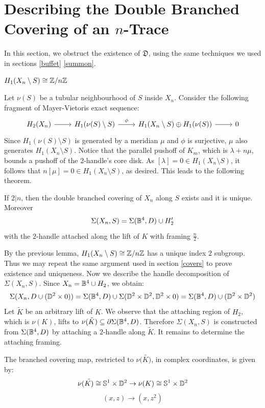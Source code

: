 \section{Describing the Double Branched Covering of an $n$-Trace}
In this section, we obstruct the existence of $\mathfrak{D}$, using the same techniques we used in sections \ref{buffet} \ref{summon}. 
\begin{lem}\label{warietto} $H_1(X_n \setminus S) \cong \mathbb{Z}/n\mathbb{Z}$
\end{lem}
\proof Let $\nu(S)$ be a tubular neighbourhood of $S$ inside $X_n$. Consider the following fragment of Mayer-Vietoris exact sequence: 
$$
\begin{tikzcd}
H_2(X_n) \arrow[r] & H_1(\nu(S) \setminus S) \arrow[r, "\phi"] & H_1(X_n \setminus S)\oplus H_1(\nu(S)) \arrow[r] & 0
\end{tikzcd}$$
Since $H_1(\nu(S) \setminus S)$ is generated by a meridian $\mu$ and $\phi$ is surjective, $\mu$ also generates $H_1(X_n \setminus S)$.
Notice that the parallel pushoff of $K_m$, which is $\lambda + n\mu$, bounds a pushoff of the $2$-handle's core disk. As $[\lambda] = 0 \in H_1(X_n \setminus S)$, it follows that $n[\mu] = 0 \in H_1(X_n \setminus S)$, as desired.
\endproof
This leads to the following theorem.
\begin{thm}\label{wario}
If $2|n$, then the double branched covering of $X_n$ along $S$ exists and it is unique.
Moreover $$
\Sigma(X_n, S) = \Sigma(\mathbb{B}^4, D) \cup H'_2
$$ with the $2$-handle attached along the lift of $K$ with framing $\frac{n}{2}$.
\end{thm}
\proof
By the previous lemma, $H_1(X_n \setminus S) \cong \mathbb{Z}/n\mathbb{Z}$ has a unique index $2$ subgroup. Thus we may repeat the same argument used in section \ref{covers} to prove existence and uniqueness. Now we describe the handle decomposition of $\Sigma(X_n, S)$.
Since $X_n = \mathbb{B}^4 \cup H_2$, we obtain: $$
\Sigma(X_n, D \cup (\mathbb{D}^2 \times 0) ) = \Sigma(\mathbb{B}^4, D) \cup \Sigma(\mathbb{D}^2\times \mathbb{D}^2, \\\mathbb{D}^2 \times 0) = \Sigma(\mathbb{B}^4, D) \cup (\mathbb{D}^2\times \mathbb{D}^2) 
$$
Let $\tilde{K}$ be an arbitrary lift of $K$. We observe that the attaching region of $H_2$, which is $\nu(K)$, lifts to $\nu(\tilde{K}) \subseteq \partial\Sigma(\mathbb{B}^4, D)$.
Therefore $\Sigma(X_n, S)$ is constructed from $\Sigma(\mathbb{B}^4, D)$ by attaching a $2$-handle along $\tilde{K}$. It remains to determine the attaching framing.
\begin{obs}The branched covering map, restricted to $\nu(\tilde{K)}$, in complex coordinates, is given by: $$
\nu(\tilde{K)} \cong \mathbb{S}^1 \times \mathbb{D}^2 \rightarrow \nu(K) \cong \mathbb{S}^1 \times \mathbb{D}^2
$$ $$
(x, z) \rightarrow (x, z^2)
$$
\end{obs}
